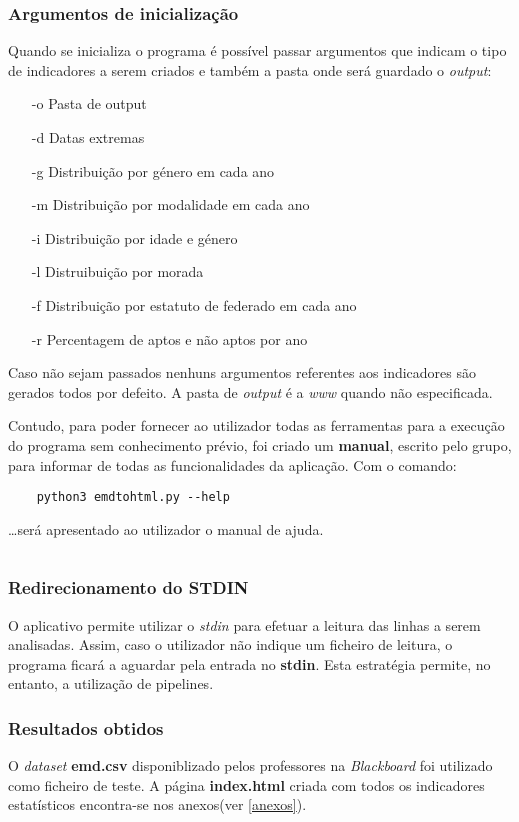 \subsubsection{Argumentos de inicialização}

Quando se inicializa o programa é possível passar argumentos que indicam o tipo de 
indicadores a serem criados e também a pasta onde será guardado o \textit{output}:
\begin{itemize}
    \item [-o]{Pasta de output}
    \item [-d]{Datas extremas}
    \item [-g]{Distribuição por género em cada ano}
    \item [-m]{Distribuição por modalidade em cada ano}
    \item [-i]{Distribuição por idade e género}
    \item [-l]{Distruibuição por morada} 
    \item [-f]{Distribuição por estatuto de federado em cada ano}
    \item [-r]{Percentagem de aptos e não aptos por ano}
\end{itemize}

Caso não sejam passados nenhuns argumentos referentes aos indicadores são
gerados todos por defeito. A pasta de \textit{output} é a \textit{www} quando não
especificada.

Contudo, para poder fornecer ao utilizador todas as ferramentas para a execução do programa sem conhecimento prévio, 
foi criado um \textbf{manual}, escrito pelo grupo, para informar de todas as funcionalidades da aplicação.
Com o comando:
\begin{verbatim}
    python3 emdtohtml.py --help
\end{verbatim}

\dots será apresentado ao utilizador o manual de ajuda.

\inputminted{bash}{manual.txt}

\subsubsection{Redirecionamento do STDIN}

O aplicativo permite utilizar o \textit{stdin} para efetuar a leitura das linhas a serem analisadas.
Assim, caso o utilizador não indique um ficheiro de leitura, o programa ficará a aguardar pela entrada no \textbf{stdin}.
Esta estratégia permite, no entanto, a utilização de pipelines.

\subsubsection{Resultados obtidos}

O \textit{dataset} \textbf{emd.csv} disponiblizado pelos professores na \textit{Blackboard}
foi utilizado como ficheiro de teste. A página \textbf{index.html} criada com todos os indicadores
estatísticos encontra-se nos anexos(ver \ref{anexos}).

